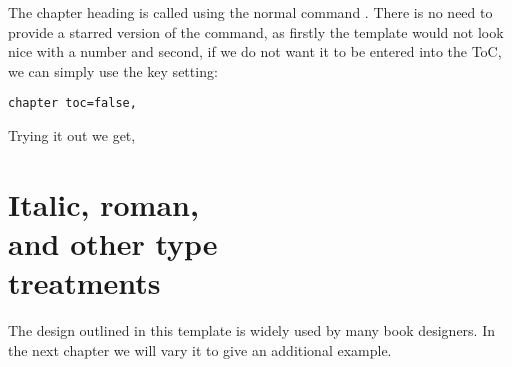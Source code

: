 The chapter heading is called using the normal \latexe command \cmd{\chapter}. There is no need to provide a starred version of the command, as firstly the template would not look nice with a number and second, if we do not want it to be entered into the ToC, we can simply use the key setting:

\begin{verbatim}
chapter toc=false,
\end{verbatim}

Trying it out we get,



\chapter[Italic, roman, and other type treatments]{Italic, roman,\\ and other type\\ treatments}

\makeatletter
\@specialfalse
\makeatother

The design outlined in this template is widely used by many book designers. In the next chapter we will vary it to 
give an additional example.







